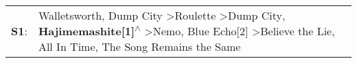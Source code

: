 \begin{supertabular}{p{0.03\textwidth}p{0.92\textwidth}}
 \textbf{S1}:  &  Walletsworth\textsuperscript{}, \enspace Dump City\textsuperscript{} \textgreater \enspace Roulette\textsuperscript{} \textgreater \enspace Dump City\textsuperscript{}, \enspace \textbf{Hajimemashite[1]\textsuperscript{$\wedge$}} \textgreater \enspace Nemo\textsuperscript{}, \enspace Blue Echo[2]\textsuperscript{} \textgreater \enspace Believe the Lie\textsuperscript{}, \enspace All In Time\textsuperscript{}, \enspace The Song Remains the Same\textsuperscript{}  \enspace  \\
\end{supertabular}
